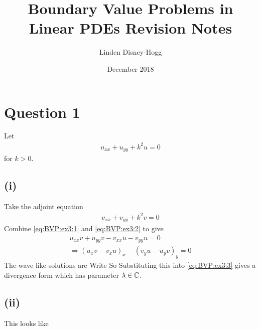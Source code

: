 \documentclass{article}
\title{Boundary Value Problems in Linear PDEs Revision Notes}
\author{Linden Disney-Hogg}
\date{December 2018}
\begin{document}
\maketitle
\tableofcontents

\section{Question 1}
Let 
\begin{align} \label{eq:BVP:ex3:1}
u_{xx} + u_{yy} + k^2 u = 0 
\end{align}
for $k>0$.
\subsection{(i)}
Take the adjoint equation  
\begin{align} \label{eq:BVP:ex3:2}
v_{xx} + v_{yy} + k^2 v = 0
\end{align}
Combine \ref{eq:BVP:ex3:1} and \ref{eq:BVP:ex3:2} to give 
\begin{align} \label{eq:BVP:ex3:3}
u_{xx} v + u_{yy} v - v_{xx} u - v_{yy} u = 0 \\
\Rightarrow (u_x v - v_x u)_x - (v_y u -u_y v)_y = 0
\end{align}
The wave like solutions are 
Write 
So 
Substituting this into \ref{eq:BVP:ex3:3} gives a divergence form which has parameter $\lambda \in \mathbb{C}$. 
\subsection{(ii)}
This looks like 
\end{document}
